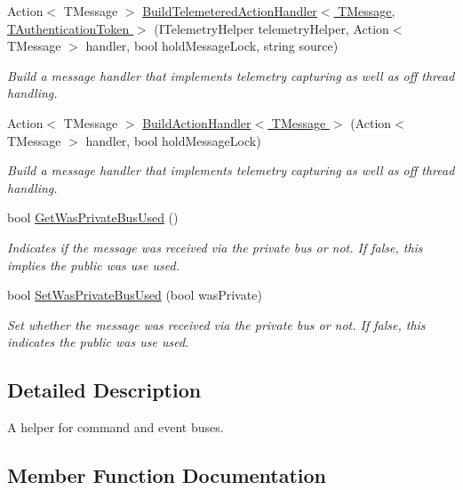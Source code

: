 \begin{DoxyCompactItemize}
Action$<$ T\+Message $>$ \hyperlink{interfaceCqrs_1_1Bus_1_1IBusHelper_a29751c186da5e2b042067af6a1be6d5d_a29751c186da5e2b042067af6a1be6d5d}{Build\+Telemetered\+Action\+Handler$<$ T\+Message, T\+Authentication\+Token $>$} (I\+Telemetry\+Helper telemetry\+Helper, Action$<$ T\+Message $>$ handler, bool hold\+Message\+Lock, string source)
\begin{DoxyCompactList}\small\item\em Build a message handler that implements telemetry capturing as well as off thread handling. \end{DoxyCompactList}\item 
Action$<$ T\+Message $>$ \hyperlink{interfaceCqrs_1_1Bus_1_1IBusHelper_ac69a1e4722e2839c2c180b9a06a8646c_ac69a1e4722e2839c2c180b9a06a8646c}{Build\+Action\+Handler$<$ T\+Message $>$} (Action$<$ T\+Message $>$ handler, bool hold\+Message\+Lock)
\begin{DoxyCompactList}\small\item\em Build a message handler that implements telemetry capturing as well as off thread handling. \end{DoxyCompactList}\item 
bool \hyperlink{interfaceCqrs_1_1Bus_1_1IBusHelper_a6e3d49a9367f3709d216f02be0277eea_a6e3d49a9367f3709d216f02be0277eea}{Get\+Was\+Private\+Bus\+Used} ()
\begin{DoxyCompactList}\small\item\em Indicates if the message was received via the private bus or not. If false, this implies the public was use used. \end{DoxyCompactList}\item 
bool \hyperlink{interfaceCqrs_1_1Bus_1_1IBusHelper_a40a395ea6d92a6162c8e584a39284bbc_a40a395ea6d92a6162c8e584a39284bbc}{Set\+Was\+Private\+Bus\+Used} (bool was\+Private)
\begin{DoxyCompactList}\small\item\em Set whether the message was received via the private bus or not. If false, this indicates the public was use used. \end{DoxyCompactList}\end{DoxyCompactItemize}


\subsection{Detailed Description}
A helper for command and event buses. 



\subsection{Member Function Documentation}
\mbox{\label{interfaceCqrs_1_1Bus_1_1IBusHelper_ac69a1e4722e2839c2c180b9a06a8646c_ac69a1e4722e2839c2c180b9a06a8646c}} 
